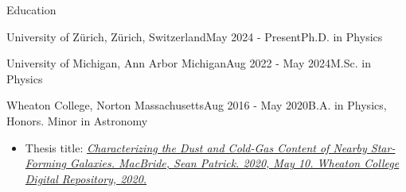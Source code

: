 \documentclass{resume} %
\begin{document}
\begin{rSection}{Education}
    \begin{rSubsection}
        {University of Zürich, Zürich, Switzerland}{May 2024 - Present}{Ph.D. in Physics}{}
    \end{rSubsection}
    
    \begin{rSubsection}
        {University of Michigan, Ann Arbor Michigan}{Aug 2022 - May 2024}{M.Sc. in Physics}{}
        
    \end{rSubsection}

\begin{rSubsection}{Wheaton College, Norton Massachusetts}{Aug 2016 - May 2020}{B.A. in Physics, Honors. Minor in Astronomy}{}
   \begin{itemize}
    \item Thesis title: \textit{\href{https://digitalrepository.wheatoncollege.edu/handle/11040/31192}{Characterizing the Dust and Cold-Gas Content of Nearby Star-Forming Galaxies. MacBride, Sean Patrick. 2020, May 10.  Wheaton College Digital Repository, 2020.}}
   \end{itemize}
\end{rSubsection}


\end{rSection}
\end{document}

